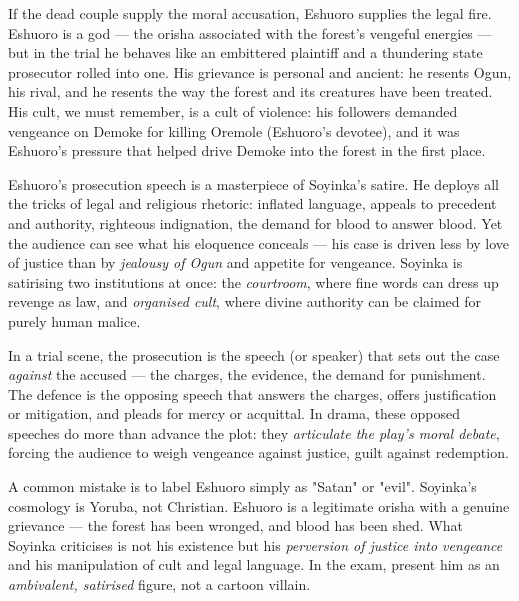 \documentclass[11pt]{article}
\newcommand{\cle}[1]{{\popxbold\color{popdark}#1}}
\begin{document}
If the dead couple supply the moral accusation, \cle{Eshuoro} supplies the legal fire. Eshuoro is a god — the orisha associated with the forest's vengeful energies — but in the trial he behaves like an embittered plaintiff and a thundering state prosecutor rolled into one. His grievance is personal and ancient: he resents \cle{Ogun}, his rival, and he resents the way the forest and its creatures have been treated. His cult, we must remember, is a \cle{cult of violence}: his followers demanded vengeance on Demoke for killing Oremole (Eshuoro's devotee), and it was Eshuoro's pressure that helped drive Demoke into the forest in the first place.

Eshuoro's prosecution speech is a masterpiece of Soyinka's satire. He deploys all the tricks of legal and religious rhetoric: inflated language, appeals to precedent and authority, righteous indignation, the demand for blood to answer blood. Yet the audience can see what his eloquence conceals — his case is driven less by love of justice than by \emph{jealousy of Ogun} and appetite for vengeance. Soyinka is satirising two institutions at once: the \emph{courtroom}, where fine words can dress up revenge as law, and \emph{organised cult}, where divine authority can be claimed for purely human malice.

\begin{definition}
In a trial scene, the \cle{prosecution} is the speech (or speaker) that sets out the case \emph{against} the accused — the charges, the evidence, the demand for punishment. The \cle{defence} is the opposing speech that answers the charges, offers justification or mitigation, and pleads for mercy or acquittal. In drama, these opposed speeches do more than advance the plot: they \emph{articulate the play's moral debate}, forcing the audience to weigh vengeance against justice, guilt against redemption.
\end{definition}

\begin{attention}
A common mistake is to label Eshuoro simply as "Satan" or "evil". Soyinka's cosmology is Yoruba, not Christian. Eshuoro is a legitimate orisha with a genuine grievance — the forest has been wronged, and blood has been shed. What Soyinka criticises is not his existence but his \emph{perversion of justice into vengeance} and his manipulation of cult and legal language. In the exam, present him as an \emph{ambivalent, satirised} figure, not a cartoon villain.
\end{attention}
\end{document}

